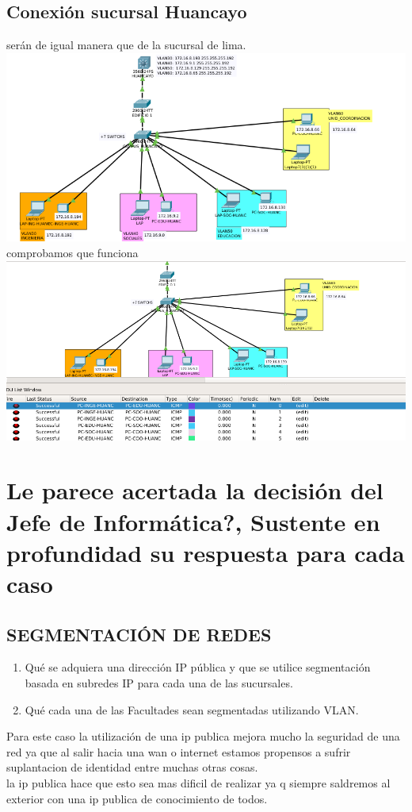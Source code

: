 \subsection{Conexi\'on sucursal Huancayo}
ser\'an de igual manera que de la sucursal de lima.
\\
\includegraphics[scale=0.45]{img/VLANHUANCAYO.png} 
\\comprobamos que funciona
\\\includegraphics[scale=0.45]{img/HUANCAYOSUCESS.png} 

\section{\¿Le parece acertada la decisi\'on del Jefe de Inform\'atica?, Sustente en profundidad su respuesta para cada caso}
\subsection{SEGMENTACI\'ON DE REDES}
\begin{definicion}[]
{
\begin{enumerate}[label=\itembolasazules{}]
\item Qu\'e se adquiera una direcci\'on IP p\'ublica y que se utilice
segmentaci\'on basada en subredes IP para cada una de las sucursales.
\item Qu\'e cada una de las Facultades sean segmentadas utilizando VLAN.
\end{enumerate}
}
\end{definicion}
Para este caso la utilizaci\'on de una ip publica mejora mucho la seguridad de una red ya que al salir hacia una wan o internet estamos propensos a sufrir suplantacion de identidad entre muchas otras cosas.
\\
la ip publica hace que esto sea mas dificil de realizar ya q siempre saldremos al exterior con una ip publica de conocimiento de todos.\\

